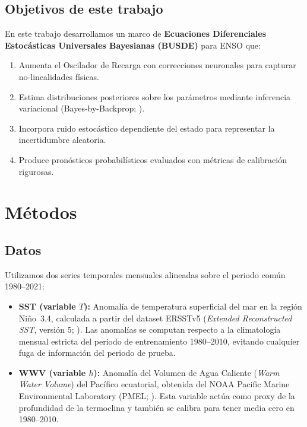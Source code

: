 \documentclass[11pt,a4paper]{article}
\begin{document}
\subsection{Objetivos de este trabajo}

En este trabajo desarrollamos un marco de \textbf{Ecuaciones Diferenciales Estocásticas Universales Bayesianas (BUSDE)} para ENSO que:
\begin{enumerate}[label=(\roman*)]
  \item Aumenta el Oscilador de Recarga con correcciones neuronales para capturar no-linealidades físicas.
  \item Estima distribuciones posteriores sobre los parámetros mediante inferencia variacional (Bayes-by-Backprop; \citealt{blundell2015}).
  \item Incorpora ruido estocástico dependiente del estado para representar la incertidumbre aleatoria.
  \item Produce pronósticos probabilísticos evaluados con métricas de calibración rigurosas.
\end{enumerate}

\section{Métodos}
\label{sec:metodos}

\subsection{Datos}
\label{sec:datos}

Utilizamos dos series temporales mensuales alineadas sobre el periodo común 1980--2021:
\begin{itemize}
  \item \textbf{SST (variable $T$):} Anomalía de temperatura superficial del mar en la región Niño~3.4, calculada a partir del dataset ERSSTv5 (\textit{Extended Reconstructed SST}, versión 5; \citealt{huang2017}). Las anomalías se computan respecto a la climatología mensual estricta del periodo de entrenamiento 1980--2010, evitando cualquier fuga de información del periodo de prueba.
  \item \textbf{WWV (variable $h$):} Anomalía del Volumen de Agua Caliente (\textit{Warm Water Volume}) del Pacífico ecuatorial, obtenida del NOAA Pacific Marine Environmental Laboratory (PMEL; \citealt{meinen2000}). Esta variable actúa como proxy de la profundidad de la termoclina y también se calibra para tener media cero en 1980--2010.
\end{itemize}
\end{document}

